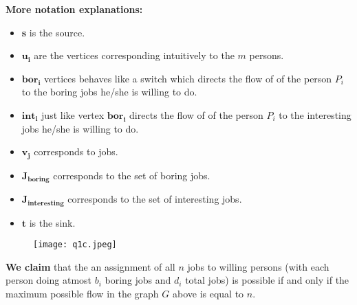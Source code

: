 \documentclass[11pt, fleqn]{article}
\begin{document}
\textbf{More notation explanations: } \begin{itemize}
    \item \textbf{s} is the source.
    
    \item $\boldsymbol{u_i}$ are the vertices corresponding intuitively to the $m$ persons.
    
    \item $\boldsymbol{bor_i}$ vertices behaves like a switch which directs the flow of of the person $P_i$ to the boring jobs he/she is willing to do.
    
    \item $\boldsymbol{int_i}$ just like vertex $\boldsymbol{bor_i}$ directs the flow of of the person $P_i$ to the interesting jobs he/she is willing to do.
    
    \item $\boldsymbol{v_j}$ corresponds to jobs.
    
    \item $\boldsymbol{J_{boring}}$ corresponds to the set of boring jobs.
    
    \item $\boldsymbol{J_{interesting}}$ corresponds to the set of interesting jobs.
    
    \item $\boldsymbol{t}$ is the sink.
\end{itemize}

\begin{figure}[hbt!]
\centering
\begin{minipage}{1\textwidth}
  \centering
  \texttt{[image: q1c.jpeg]}
\end{minipage}
\end{figure}

\textbf{We claim} that the an assignment of all $n$ jobs to willing persons (with each person doing atmost $b_i$ boring jobs and $d_i$  total jobs) is possible if and only if the maximum possible flow in the graph $G$ above is equal to $n$.

\bigskip
\end{document}
